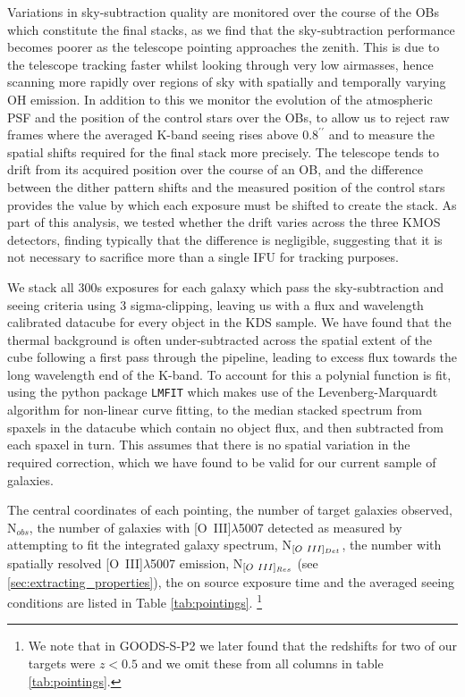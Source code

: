 \documentclass[fleqn,usenatbib]{mn2e}
\begin{document}
Variations in sky-subtraction quality are monitored over the course of the OBs which constitute the final stacks, as we find that the sky-subtraction performance becomes poorer as the telescope pointing approaches the zenith.
This is due to the telescope tracking faster whilst looking through very low airmasses, hence scanning more rapidly over regions of sky with spatially and temporally varying OH emission.
In addition to this we monitor the evolution of the atmospheric PSF and the position of the control stars over the OBs, to allow us to reject raw frames where the averaged K-band seeing rises above $0.8^{\prime\prime}$ and to measure the spatial shifts required for the final stack more precisely.
The telescope tends to drift from its acquired position over the course of an OB, and the difference between the dither pattern shifts and the measured position of the control stars provides the value by which each exposure must be shifted to create the stack. 
As part of this analysis, we tested whether the drift varies across the three KMOS detectors, finding typically that the difference is negligible, suggesting that it is not necessary to sacrifice more than a single IFU for tracking purposes.

We stack all 300s exposures for each galaxy which pass the sky-subtraction and seeing criteria using 3 sigma-clipping, leaving us with a flux and wavelength calibrated datacube for every object in the KDS sample.
We have found that the thermal background is often under-subtracted across the spatial extent of the cube following a first pass through the pipeline, leading to excess flux towards the long wavelength end of the K-band.
To account for this a polynial function is fit, using the python package {\tt LMFIT} \citep{Newville2014} which makes use of the Levenberg-Marquardt algorithm for non-linear curve fitting, to the median stacked spectrum from spaxels in the datacube which contain no object flux, and then subtracted from each spaxel in turn.
This assumes that there is no spatial variation in the required correction, which we have found to be valid for our current sample of galaxies.

The central coordinates of each pointing, the number of target galaxies observed, N$_{obs}$, the number of galaxies with [O~{\sc III}]$\lambda$5007 detected as measured by attempting to fit the integrated galaxy spectrum, N$_{[O~{\sc III}]_{Det}}$, the number with spatially resolved [O~{\sc III}]$\lambda$5007 emission, N$_{[O~{\sc III}]_{Res}}$ (see \cref{sec:extracting_properties}), the on source exposure time and the averaged seeing conditions are listed in Table \ref{tab:pointings}. \footnote{We note that in GOODS-S-P2 we later found that the redshifts for two of our targets were $z < 0.5$ and we omit these from all columns in table \ref{tab:pointings}.}
\end{document}
